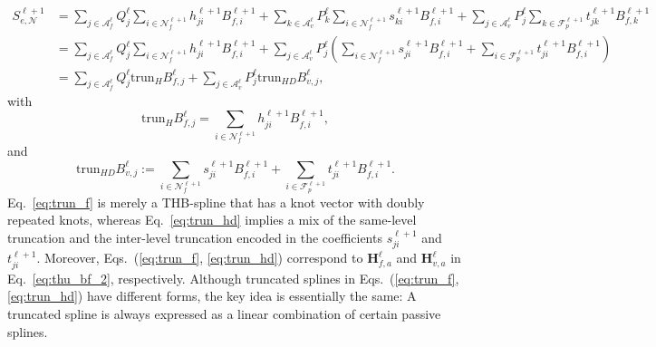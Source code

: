 \documentclass[graybox]{svmult}
\begin{document}
\begin{equation}
\begin{aligned}
S_{e,\mathcal{N}}^{\ell+1} &=\sum_{j\in\mathcal{A}_f^{\ell}} Q_j^{\ell}  \sum_{i\in \mathcal{N}_f^{\ell+1}} h_{ji}^{\ell+1} B_{f\!,i}^{\ell+1} + \sum_{k\in\mathcal{A}_v^\ell} P_k^{\ell}  \sum_{i\in \mathcal{N}_f^{\ell+1}} s_{ki}^{\ell+1} B_{f\!,i}^{\ell+1} + \sum_{j\in\mathcal{A}_v^\ell} P_j^{\ell}  \sum_{k\in\mathcal{F}_p^{\ell+1}}  t_{jk}^{\ell+1} B_{f\!,k}^{\ell+1}  \\
&=\sum_{j\in\mathcal{A}_f^{\ell}} Q_j^{\ell}  \sum_{i\in \mathcal{N}_f^{\ell+1}} h_{ji}^{\ell+1} B_{f\!,i}^{\ell+1} + \sum_{j\in\mathcal{A}_v^\ell} P_j^{\ell}  \left( \sum_{i\in \mathcal{N}_f^{\ell+1}} s_{ji}^{\ell+1} B_{f\!,i}^{\ell+1} + \sum_{i\in\mathcal{F}_p^{\ell+1}}  t_{ji}^{\ell+1} B_{f\!,i}^{\ell+1} \right) \\
&=\sum_{j\in\mathcal{A}_f^{\ell}} Q_j^{\ell}  \mathrm{trun}_H B_{f\!,j}^{\ell}  + \sum_{j\in\mathcal{A}_v^\ell} P_j^{\ell}  \mathrm{trun}_{H\!D} B_{v,j}^{\ell},
\end{aligned}
\label{eq:sp2}
\end{equation}
with
\begin{equation}
\mathrm{trun}_H B_{f\!,j}^\ell = \sum_{i\in \mathcal{N}_f^{\ell+1}} h_{ji}^{\ell+1} B_{f\!,i}^{\ell+1},
\label{eq:trun_f}
\end{equation}
and
\begin{equation}
\mathrm{trun}_{H\!D} B_{v,j}^{\ell} := \sum_{i\in \mathcal{N}_f^{\ell+1}} s_{ji}^{\ell+1} B_{f\!,i}^{\ell+1} + \sum_{i\in\mathcal{F}_p^{\ell+1}}  t_{ji}^{\ell+1} B_{f\!,i}^{\ell+1}.
\label{eq:trun_hd}
\end{equation}
Eq.~\eqref{eq:trun_f} is merely a THB-spline that has a knot vector with doubly repeated knots, whereas Eq.~\eqref{eq:trun_hd} implies a mix of the same-level truncation and the inter-level truncation encoded in the coefficients $s_{ji}^{\ell+1}$ and $t_{ji}^{\ell+1}$. Moreover, Eqs.~(\ref{eq:trun_f}, \ref{eq:trun_hd}) correspond to $\bm{H}_{f\!,a}^\ell$ and $\bm{H}_{v,a}^\ell$ in Eq.~\eqref{eq:thu_bf_2}, respectively. Although truncated splines in Eqs.~(\ref{eq:trun_f}, \ref{eq:trun_hd}) have different forms, the key idea is essentially the same: A truncated spline is always expressed as a linear combination of certain passive splines.
\end{document}
